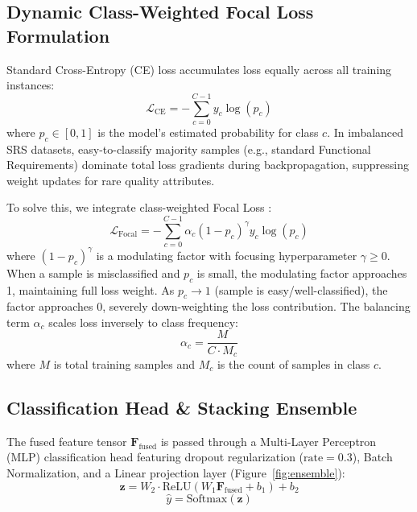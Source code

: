 \documentclass[11pt,a4paper]{article}
\begin{document}
\subsection{Dynamic Class-Weighted Focal Loss Formulation}
Standard Cross-Entropy (CE) loss accumulates loss equally across all training instances:
\begin{equation}
\mathcal{L}_{\text{CE}} = - \sum_{c=0}^{C-1} y_c \log(p_c)
\end{equation}
where $p_c \in [0,1]$ is the model's estimated probability for class $c$. In imbalanced SRS datasets, easy-to-classify majority samples (e.g., standard Functional Requirements) dominate total loss gradients during backpropagation, suppressing weight updates for rare quality attributes.

To solve this, we integrate class-weighted Focal Loss \cite{lin2017focal}:
\begin{equation}
\mathcal{L}_{\text{Focal}} = - \sum_{c=0}^{C-1} \alpha_c (1 - p_c)^\gamma y_c \log(p_c)
\end{equation}
where $(1 - p_c)^\gamma$ is a modulating factor with focusing hyperparameter $\gamma \ge 0$. When a sample is misclassified and $p_c$ is small, the modulating factor approaches 1, maintaining full loss weight. As $p_c \to 1$ (sample is easy/well-classified), the factor approaches 0, severely down-weighting the loss contribution. The balancing term $\alpha_c$ scales loss inversely to class frequency:
\begin{equation}
\alpha_c = \frac{M}{C \cdot M_c}
\end{equation}
where $M$ is total training samples and $M_c$ is the count of samples in class $c$.

\subsection{Classification Head & Stacking Ensemble}
The fused feature tensor $\mathbf{F}_{\text{fused}}$ is passed through a Multi-Layer Perceptron (MLP) classification head featuring dropout regularization ($\text{rate}=0.3$), Batch Normalization, and a Linear projection layer (Figure~\ref{fig:ensemble}):
\begin{equation}
\mathbf{z} = W_2 \cdot \text{ReLU}\left(W_1 \mathbf{F}_{\text{fused}} + b_1\right) + b_2
\end{equation}
\begin{equation}
\hat{y} = \text{Softmax}(\mathbf{z})
\end{equation}
\end{document}
